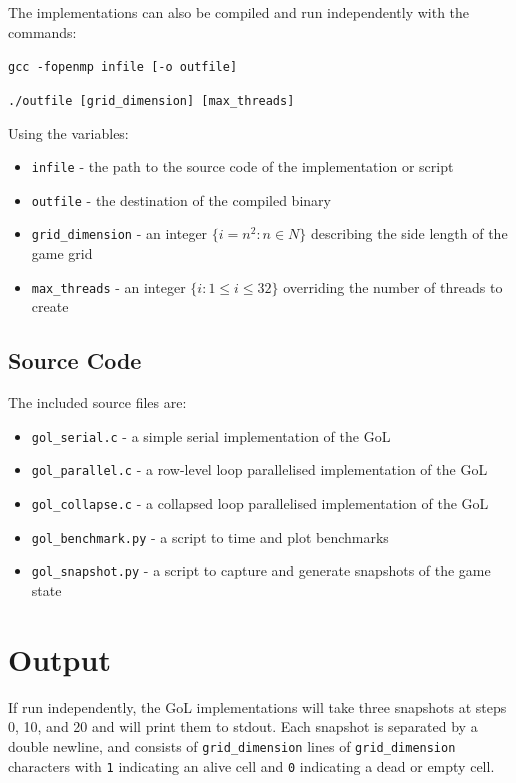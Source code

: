 \documentclass[]{article}
\begin{document}
\noindent The implementations can also be compiled and run independently with the commands:
\begin{quoting}
\texttt{gcc -fopenmp infile [-o outfile]}

\noindent
\texttt{./outfile [grid\_dimension] [max\_threads]}
\end{quoting}

\noindent Using the variables:
\begin{itemize}[label={}]
\item \texttt{infile} - the path to the source code of the implementation or script
\item \texttt{outfile} - the destination of the compiled binary
\item \texttt{grid\_dimension} - an integer $\lbrace i = n^2 : n \in N \rbrace$  describing the side length of the game grid
\item \texttt{max\_threads} - an integer $\lbrace i : 1 \leq i \leq 32\rbrace$ overriding the number of threads to create
\end{itemize}

\subsection{Source Code}
\noindent The included source files are:
\begin{itemize}[label={}]
\item \texttt{gol\_serial.c} - a simple serial implementation of the GoL

\item \texttt{gol\_parallel.c} - a row-level loop parallelised implementation of the GoL

\item \texttt{gol\_collapse.c} - a collapsed loop parallelised implementation of the GoL

\item \texttt{gol\_benchmark.py} - a script to time and plot benchmarks

\item \texttt{gol\_snapshot.py} - a script to capture and generate snapshots of the game state
\end{itemize}

\section{Output}
If run independently, the GoL implementations will take three snapshots at steps 0, 10, and 20 and will print them to stdout. Each snapshot is separated by a double newline, and consists of \texttt{grid\_dimension} lines of \texttt{grid\_dimension} characters with \texttt{1} indicating an alive cell and \texttt{0} indicating a dead or empty cell.
\end{document}
